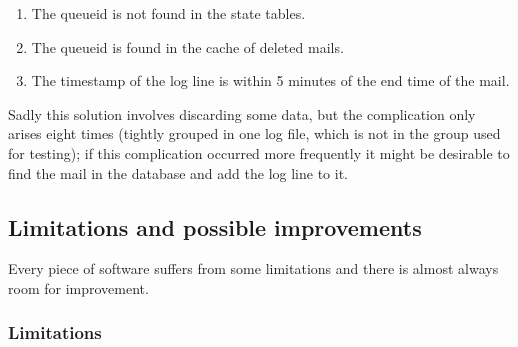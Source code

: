 \begin{enumerate}

    \item The queueid is not found in the state tables. 

    \item The queueid is found in the cache of deleted mails.

    \item The timestamp of the log line is within 5 minutes of the end time
        of the mail.

\end{enumerate}

Sadly this solution involves discarding some data, but the complication
only arises eight times (tightly grouped in one log file, which is not in
the group used for testing); if this complication occurred more frequently
it might be desirable to find the mail in the database and add the log
line to it.

\subsection{Limitations and possible improvements}

\label{limitations-improvements}

Every piece of software suffers from some limitations and there is almost
always room for improvement.

\subsubsection{Limitations}

\label{logging helo}

